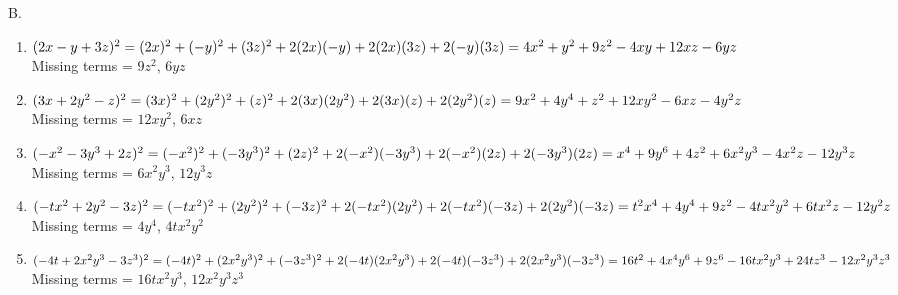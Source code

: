 B.  
\begin{enumerate}[label = \arabic*. ]
\item \hspce $(2x - y + 3z)^{2}\\
= (2x)^{2}+(- y)^{2}+(3z)^{2}+2(2x)(- y)+2(2x)(3z)+2(- y)(3z) \\
= 4 x^{2} + y^{2} + 9z^2  - 4 x y + 12 x z  - 6yz  $\\
Missing terms = $9z^2$, $6yz$

\item \hspce $(3x + 2y^{2} - z)^{2}\\
= (3x)^{2}+(2y^{2})^{2}+(z)^{2}+2(3x)(2y^{2})+2(3x)(z)+2(2y^{2})(z) \\
= 9 x^{2} + 4 y^{4} + z^{2} + 12xy^2  - 6xz   - 4 y^{2} z$\\
Missing terms = $12xy^2 $, $6xz$
\item \hspce $(-x^{2} - 3y^{3} + 2z)^{2}
= (-x^{2})^{2}+(- 3y^{3})^{2}+(2z)^{2}+2(-x^{2})(- 3y^{3})+2(-x^{2})(2z)+2(- 3y^{3})(2z) \\
= x^{4} + 9 y^{6} + 4 z^{2} + 6 x^{2} y^{3}  - 4 x^{2} z - 12 y^{3} z  $\\
Missing terms = $6 x^{2} y^{3} $, $12 y^{3} z $
\item \hspce $(-tx^{2} + 2y^{2} - 3z)^{2}
= (-tx^{2})^{2}+(2y^{2})^{2}+(- 3z)^{2}+2(-tx^{2})(2y^{2})+2(-tx^{2})(- 3z)+2(2y^{2})(- 3z) \\
= t^{2} x^{4} + 4 y^{4}  + 9 z^{2} - 4 t x^{2} y^{2}  + 6 t x^{2} z  - 12 y^{2} z $\\
Missing terms = $4 y^{4}$, $4 t x^{2} y^{2}$

\item \hspce $(-4t + 2x^{2}y^{3} - 3z^{3})^{2}\\
= (-4t)^{2}+(2x^{2}y^{3})^{2}+(- 3z^{3})^{2}+2(-4t)(2x^{2}y^{3})+2(-4t)(- 3z^{3})+2(2x^{2}y^{3})(- 3z^{3}) \\
= 16 t^{2} + 4 x^{4} y^{6} + 9 z^{6} - 16 t x^{2} y^{3}  + 24 t z^{3}  - 12 x^{2} y^{3} z^{3}  $\\
Missing terms = $16 t x^{2} y^{3}$, $12 x^{2} y^{3} z^{3}$


\end{enumerate}  